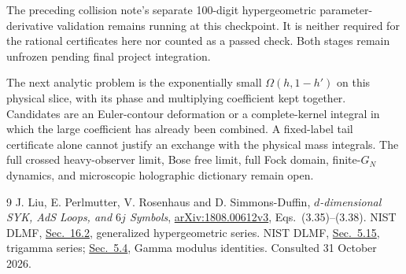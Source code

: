\documentclass[11pt,a4paper]{article}
\newcommand{\Om}{\Omega}
\begin{document}
The preceding collision note's separate 100-digit hypergeometric
parameter-derivative validation remains running at this checkpoint.
It is neither required for the rational certificates here nor counted
as a passed check. Both stages remain unfrozen pending final project
integration.

The next analytic problem is the exponentially small
$\Om(h,1-h')$ on this physical slice, with its phase and multiplying
coefficient kept together. Candidates are an Euler-contour deformation
or a complete-kernel integral in which the large coefficient has
already been combined. A fixed-label tail certificate alone cannot
justify an exchange with the physical mass integrals. The full crossed
heavy-observer limit, Bose free limit, full Fock domain, finite-$G_N$
dynamics, and microscopic holographic dictionary remain open.

\begin{thebibliography}{9}
 J. Liu, E. Perlmutter, V. Rosenhaus and D. Simmons-Duffin,
\emph{$d$-dimensional SYK, AdS Loops, and $6j$ Symbols},
\href{https://arxiv.org/html/1808.00612v3}{arXiv:1808.00612v3},
Eqs.\ (3.35)--(3.38).
 NIST DLMF,
\href{https://dlmf.nist.gov/16.2}{Sec.\ 16.2}, generalized hypergeometric series.
 NIST DLMF,
\href{https://dlmf.nist.gov/5.15}{Sec.\ 5.15}, trigamma series;
\href{https://dlmf.nist.gov/5.4}{Sec.\ 5.4}, Gamma modulus identities.
Consulted 31 October 2026.
\end{thebibliography}
\end{document}
